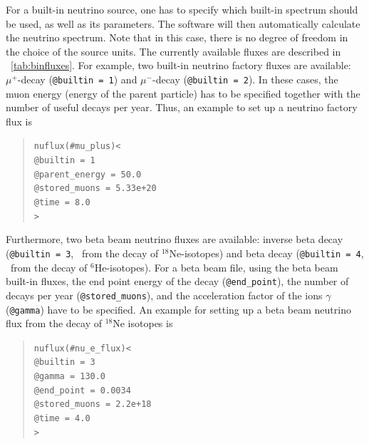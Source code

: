 For a built-in neutrino source, one has to specify which
built-in spectrum should be used, as well as its parameters. The software
will then automatically calculate the neutrino spectrum. Note that in this
case, there is no degree of freedom in the choice of the source units.
The currently available fluxes are described in \Tab~\ref{tab:binfluxes}.
For example, two built-in neutrino factory fluxes are available: $\mu^+$-decay ({\tt @builtin = 1}) and $\mu^-$-decay ({\tt @builtin = 2}). In these cases, the muon energy (energy of the parent particle) has to be specified together with the number of useful decays  per year. Thus, an example to set up a neutrino factory flux is 
\begin{quote}
{\tt nuflux(\#mu\_plus)<\\
\tb  @builtin = 1\\
\tb  @parent\_energy = 50.0\\
\tb  @stored\_muons = 5.33e+20\\
\tb  @time = 8.0\\
>}
\end{quote}
%
Furthermore, two beta beam neutrino fluxes are available: inverse beta decay ({\tt @builtin = 3}, \ie\ from the decay of
$^{18}$Ne-isotopes) and beta decay ({\tt @builtin = 4}, \ie\ from the decay of $^{6}$He-isotopes). For a beta beam file, using
the beta beam built-in fluxes, the end point energy of the decay ({\tt @end\_point}), the number of decays per year 
({\tt @stored\_muons}), and the acceleration factor of the ions $\gamma$ ({\tt @gamma}) have to be specified. An example for
setting up a beta beam neutrino flux from the decay of $^{18}$Ne isotopes is
\begin{quote}
{\tt nuflux(\#nu\_e\_flux)<\\
\tb  @builtin = 3\\
\tb  @gamma = 130.0\\
\tb  @end\_point = 0.0034\\
\tb  @stored\_muons = 2.2e+18\\
\tb  @time = 4.0\\
>}
\end{quote}
%
